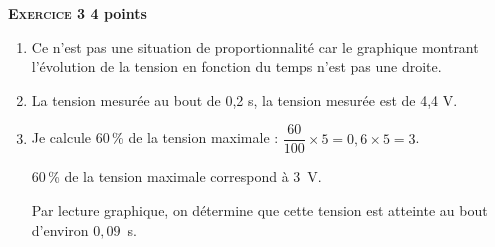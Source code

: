 \textbf{\textsc{Exercice 3} \hfill 4 points}

\medskip

\begin{enumerate}
\item Ce n'est pas une situation de proportionnalité car le graphique montrant
l'évolution de la tension en fonction du temps n'est pas une droite.
\item La tension mesurée au bout de 0,2 s, la tension mesurée est de 4,4 V.
\item Je calcule 60\,\% de la tension maximale : $\dfrac{60}{100} \times 5 = 0,6 \times 5 = 3$.

60\,\% de la tension maximale correspond à 3~V.

Par lecture graphique, on détermine que cette tension est atteinte au bout
d'environ $0,09$~s.
\end{enumerate}

\bigskip

